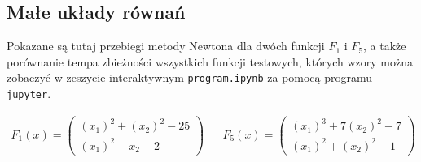 \documentclass[11pt,wide]{mwart}
\begin{document}
\subsection{Małe układy równań}

Pokazane są tutaj przebiegi metody Newtona dla dwóch funkcji $ F_1 $ i $ F_5 $, a także porównanie tempa zbieżności wszystkich funkcji testowych, których wzory można zobaczyć w zeszycie interaktywnym \texttt{program.ipynb} za pomocą programu \texttt{jupyter}.

\begin{align*}
F_1(x) = 
\left(\begin{matrix}
	(x_1)^2 + (x_2)^2 - 25 \\
	(x_1)^2 - x_2 - 2
\end{matrix}\right) && F_5(x) =
\left(\begin{matrix}
(x_1)^3 + 7(x_2)^2 - 7 \\
(x_1)^2 + (x_2)^2 - 1
\end{matrix}\right)
\end{align*}
\end{document}
